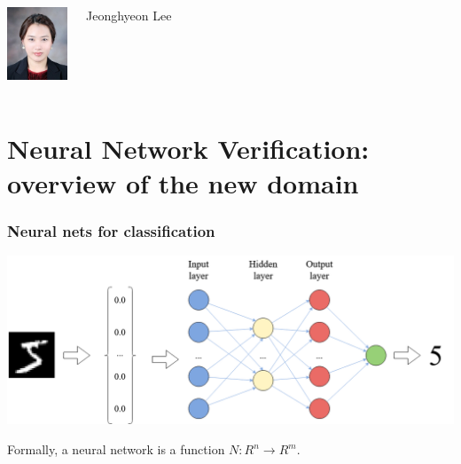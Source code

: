 \documentclass{beamer}
\begin{document}
\begin{frame}
\begin{columns}
\includegraphics[width=1.8cm]{Images/JL.jpeg}
\begin{block}{\footnotesize{Jeonghyeon Lee}}
   \end{block}
    
   
  \end{columns}
  \end{frame}




\section{Neural Network Verification: overview of the new domain}


\begin{frame}
\frametitle{Neural nets for classification}
\includegraphics[scale=.30]{Images/mnist_classification.png}

\begin{block}{Formally,}
 a neural network is a function $N : R^n \rightarrow R^m$.
\end{block}

\end{frame}
\end{document}

